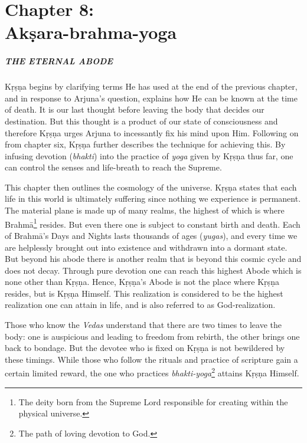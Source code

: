 \chapter{Chapter 8: \\Akṣara-brahma-yoga}\label{chap-aksara-brahma-yoga}

\paragraph*{\MakeUppercase{The Eternal Abode}}

\noindent Kṛṣṇa begins by clarifying terms He has used at the end of the previous chapter, and in response to Arjuna’s question, explains how He can be known at the time of death. It is our last thought before leaving the body that decides our destination. But this thought is a product of our state of consciousness and therefore Kṛṣṇa urges Arjuna to incessantly fix his mind upon Him. Following on from chapter six, Kṛṣṇa further describes the technique for achieving this. By infusing devotion (\textit{bhakti}) into the practice of \textit{yoga} given by Kṛṣṇa thus far, one can control the senses and life-breath to reach the Supreme.

This chapter then outlines the cosmology of the universe. Kṛṣṇa states that each life in this world is ultimately suffering since nothing we experience is permanent. The material plane is made up of many realms, the highest of which is where Brahmā\footnote{The deity born from the Supreme Lord responsible for creating within the physical universe.} resides. But even there one is subject to constant birth and death. Each of Brahmā’s Days and Nights lasts thousands of ages (\textit{yugas}), and every time we are helplessly brought out into existence and withdrawn into a dormant state. But beyond his abode there is another realm that is beyond this cosmic cycle and does not decay. Through pure devotion one can reach this highest Abode which is none other than Kṛṣṇa. Hence, Kṛṣṇa's Abode is not the place where Kṛṣṇa resides, but is Kṛṣṇa Himself. This realization is considered to be the highest realization one can attain in life, and is also referred to as God-realization.

Those who know the \textit{Vedas} understand that there are two times to leave the body: one is auspicious and leading to freedom from rebirth, the other brings one back to bondage. But the devotee who is fixed on Kṛṣṇa is not bewildered by these timings. While those who follow the rituals and practice of scripture gain a certain limited reward, the one who practices \textit{bhakti-yoga}\footnote{The path of loving devotion to God.} attains Kṛṣṇa Himself.

